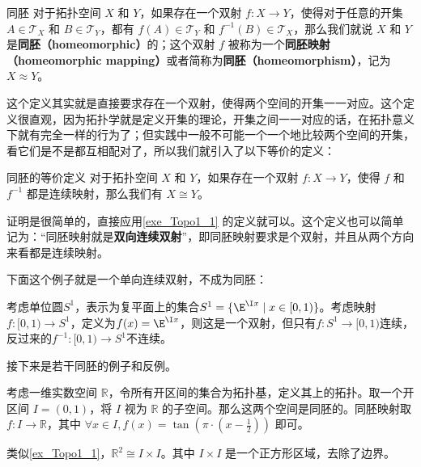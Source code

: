 \begin{definition}{同胚}
对于拓扑空间 $X$ 和 $Y$，如果存在一个双射 $f:X\rightarrow Y$，使得对于任意的开集 $A\in\mathcal{T}_X$ 和 $B\in\mathcal{T}_Y$，都有 $f(A)\in\mathcal{T}_Y$ 和 $f^{-1}(B)\in\mathcal{T}_X$，那么我们就说 $X$ 和 $Y$ 是\textbf{同胚（homeomorphic）}的；这个双射 $f$ 被称为一个\textbf{同胚映射（homeomorphic mapping）}或者简称为\textbf{同胚（homeomorphism）}，记为 $X\approx Y$。
\end{definition}

这个定义其实就是直接要求存在一个双射，使得两个空间的开集一一对应。这个定义很直观，因为拓扑学就是定义开集的理论，开集之间一一对应的话，在拓扑意义下就有完全一样的行为了；但实践中一般不可能一个一个地比较两个空间的开集，看它们是不是都互相配对了，所以我们就引入了以下等价的定义：

\begin{theorem}{同胚的等价定义}\label{the_Topo1_1}
对于拓扑空间 $X$ 和 $Y$，如果存在一个双射 $f:X\rightarrow Y$，使得 $f$ 和 $f^{-1}$ 都是连续映射，那么我们有 $X\cong Y$。
\end{theorem}

证明是很简单的，直接应用\autoref{exe_Topo1_1} 的定义就可以。这个定义也可以简单记为：“同胚映射就是\textbf{双向连续双射}”，即同胚映射要求是个双射，并且从两个方向来看都是连续映射。

下面这个例子就是一个单向连续双射，不成为同胚：

\begin{example}{}

考虑单位圆$S^1$，表示为复平面上的集合$S^1=\{\E^{\I x}\mid x\in[0, 1)\}$。考虑映射$f:[0, 1)\to S^1$，定义为$f(x)=\E^{\I x}$，则这是一个双射，但只有$f:S^1\to[0, 1)$连续，反过来的$f^{-1}:[0, 1)\to S^1$不连续。

\end{example}

接下来是若干同胚的例子和反例。

\begin{example}{}\label{ex_Topo1_1}
考虑一维实数空间 $\mathbb{R}$，令所有开区间的集合为拓扑基，定义其上的拓扑。取一个开区间 $I=(0, 1)$，将 $I$ 视为 $\mathbb{R}$ 的子空间。那么这两个空间是同胚的。同胚映射取 $f:I\rightarrow\mathbb{R}$，其中 $\forall x\in I, f(x)=\tan{(\pi\cdot(x-\frac{1}{2}))}$ 即可。
\end{example}

\begin{example}{}\label{ex_Topo1_2}
类似\autoref{ex_Topo1_1}，$\mathbb{R}^2\cong I\times I$。其中 $I\times I$ 是一个正方形区域，去除了边界。
\end{example}

